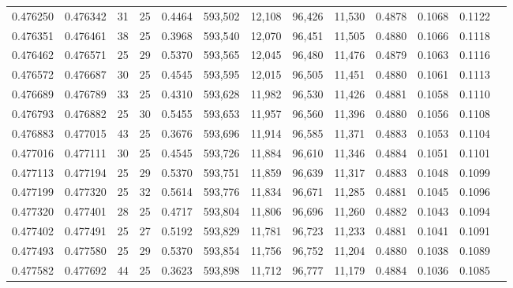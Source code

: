 \begin{tabular}{rrrrrrrrrrrrr}
0.476250 & 0.476342 &    31 &  25 &                                     0.4464 & 593,502 &  12,108 &  96,426 &  11,530 & 0.4878 & 0.1068 & 0.1122 \\
0.476351 & 0.476461 &    38 &  25 &                                     0.3968 & 593,540 &  12,070 &  96,451 &  11,505 & 0.4880 & 0.1066 & 0.1118 \\
0.476462 & 0.476571 &    25 &  29 &                                     0.5370 & 593,565 &  12,045 &  96,480 &  11,476 & 0.4879 & 0.1063 & 0.1116 \\
0.476572 & 0.476687 &    30 &  25 &                                     0.4545 & 593,595 &  12,015 &  96,505 &  11,451 & 0.4880 & 0.1061 & 0.1113 \\
0.476689 & 0.476789 &    33 &  25 &                                     0.4310 & 593,628 &  11,982 &  96,530 &  11,426 & 0.4881 & 0.1058 & 0.1110 \\
0.476793 & 0.476882 &    25 &  30 &                                     0.5455 & 593,653 &  11,957 &  96,560 &  11,396 & 0.4880 & 0.1056 & 0.1108 \\
0.476883 & 0.477015 &    43 &  25 &                                     0.3676 & 593,696 &  11,914 &  96,585 &  11,371 & 0.4883 & 0.1053 & 0.1104 \\
0.477016 & 0.477111 &    30 &  25 &                                     0.4545 & 593,726 &  11,884 &  96,610 &  11,346 & 0.4884 & 0.1051 & 0.1101 \\
0.477113 & 0.477194 &    25 &  29 &                                     0.5370 & 593,751 &  11,859 &  96,639 &  11,317 & 0.4883 & 0.1048 & 0.1099 \\
0.477199 & 0.477320 &    25 &  32 &                                     0.5614 & 593,776 &  11,834 &  96,671 &  11,285 & 0.4881 & 0.1045 & 0.1096 \\
0.477320 & 0.477401 &    28 &  25 &                                     0.4717 & 593,804 &  11,806 &  96,696 &  11,260 & 0.4882 & 0.1043 & 0.1094 \\
0.477402 & 0.477491 &    25 &  27 &                                     0.5192 & 593,829 &  11,781 &  96,723 &  11,233 & 0.4881 & 0.1041 & 0.1091 \\
0.477493 & 0.477580 &    25 &  29 &                                     0.5370 & 593,854 &  11,756 &  96,752 &  11,204 & 0.4880 & 0.1038 & 0.1089 \\
0.477582 & 0.477692 &    44 &  25 &                                     0.3623 & 593,898 &  11,712 &  96,777 &  11,179 & 0.4884 & 0.1036 & 0.1085 \\

\end{tabular}
